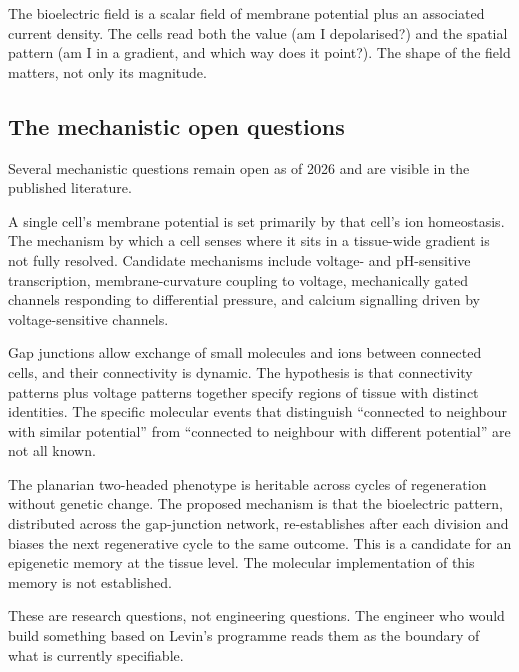  The bioelectric field is a scalar field of
membrane potential plus an associated current density. The cells read
both the value (am I depolarised?) and the spatial pattern (am I in a
gradient, and which way does it point?). The shape of the field
matters, not only its magnitude.

\subsection{The mechanistic open questions}

Several mechanistic questions remain open as of 2026 and are visible in
the published literature.

 A single cell's
membrane potential is set primarily by that cell's ion homeostasis. The
mechanism by which a cell senses where it sits in a tissue-wide
gradient is not fully resolved. Candidate mechanisms include voltage-
and pH-sensitive transcription, membrane-curvature coupling to
voltage, mechanically gated channels responding to differential
pressure, and calcium signalling driven by voltage-sensitive channels.

 Gap junctions allow exchange
of small molecules and ions between connected cells, and their
connectivity is dynamic. The hypothesis is that connectivity patterns
plus voltage patterns together specify regions of tissue with distinct
identities. The specific molecular events that distinguish ``connected
to neighbour with similar potential'' from ``connected to neighbour
with different potential'' are not all known.

 The
planarian two-headed phenotype is heritable across cycles of
regeneration without genetic change. The proposed mechanism is that
the bioelectric pattern, distributed across the gap-junction network,
re-establishes after each division and biases the next regenerative
cycle to the same outcome. This is a candidate for an epigenetic
memory at the tissue level. The molecular implementation of this
memory is not established.

These are research questions, not engineering questions. The engineer
who would build something based on Levin's programme reads them as the
boundary of what is currently specifiable.

